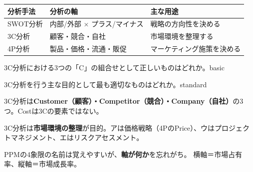 \begin{center}
\begin{tabularx}{\textwidth}{lXX}
  \toprule
  \textbf{分析手法} & \textbf{分析の軸} & \textbf{主な用途} \\
  \midrule
  SWOT分析 & 内部/外部 × プラス/マイナス & 戦略の方向性を決める \\
  3C分析 & 顧客・競合・自社 & 市場環境を整理する \\
  4P分析 & 製品・価格・流通・販促 & マーケティング施策を決める \\
  \bottomrule
\end{tabularx}
\end{center}


\begin{mondai}{3C分析における3つの「C」の組合せとして正しいものはどれか。}{basic}
\end{mondai}

\begin{mondai}{3C分析を行う主な目的として最も適切なものはどれか。}{standard}
\end{mondai}

\kaitoupage

\begin{kaisetsu}
3C分析は\textbf{Customer（顧客）・Competitor（競合）・Company（自社）}の3つ。Costは3Cの要素ではない。
\end{kaisetsu}

\begin{kaisetsu}
3C分析は\textbf{市場環境の整理}が目的。アは価格戦略（4PのPrice）、ウはプロジェクトマネジメント、エはリスクアセスメント。
\end{kaisetsu}


\mondaipage
{}

\begin{stumble}
PPMの4象限の名前は覚えやすいが、\textbf{軸が何か}を忘れがち。
横軸＝市場占有率、縦軸＝市場成長率。
\end{stumble}

